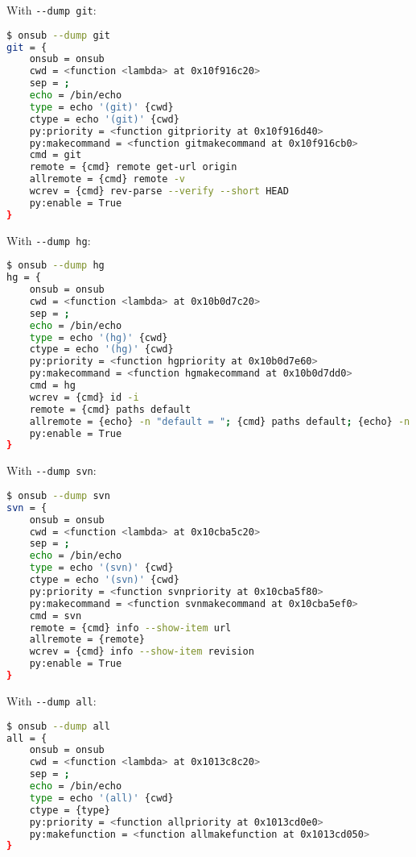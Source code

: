 With \lstinline{--dump git}:

\begin{snugshade}
\begin{lstlisting}[language=bash]	
$ onsub --dump git
git = {
	onsub = onsub
	cwd = <function <lambda> at 0x10f916c20>
	sep = ;
	echo = /bin/echo
	type = echo '(git)' {cwd}
	ctype = echo '(git)' {cwd}
	py:priority = <function gitpriority at 0x10f916d40>
	py:makecommand = <function gitmakecommand at 0x10f916cb0>
	cmd = git
	remote = {cmd} remote get-url origin
	allremote = {cmd} remote -v
	wcrev = {cmd} rev-parse --verify --short HEAD
	py:enable = True
}
\end{lstlisting}
\end{snugshade}

With \lstinline{--dump hg}:

\begin{snugshade}
\begin{lstlisting}[language=bash]	
$ onsub --dump hg
hg = {
	onsub = onsub
	cwd = <function <lambda> at 0x10b0d7c20>
	sep = ;
	echo = /bin/echo
	type = echo '(hg)' {cwd}
	ctype = echo '(hg)' {cwd}
	py:priority = <function hgpriority at 0x10b0d7e60>
	py:makecommand = <function hgmakecommand at 0x10b0d7dd0>
	cmd = hg
	wcrev = {cmd} id -i
	remote = {cmd} paths default
	allremote = {echo} -n "default = "; {cmd} paths default; {echo} -n "default-push = "; {cmd} paths default-push; {echo} -n "default-pull = "; {cmd} paths default-pull
	py:enable = True
}
\end{lstlisting}
\end{snugshade}

With \lstinline{--dump svn}:

\begin{snugshade}
\begin{lstlisting}[language=bash]
$ onsub --dump svn
svn = {
	onsub = onsub
	cwd = <function <lambda> at 0x10cba5c20>
	sep = ;
	echo = /bin/echo
	type = echo '(svn)' {cwd}
	ctype = echo '(svn)' {cwd}
	py:priority = <function svnpriority at 0x10cba5f80>
	py:makecommand = <function svnmakecommand at 0x10cba5ef0>
	cmd = svn
	remote = {cmd} info --show-item url
	allremote = {remote}
	wcrev = {cmd} info --show-item revision
	py:enable = True
}
\end{lstlisting}
\end{snugshade}

With \lstinline{--dump all}:

\begin{snugshade}
\begin{lstlisting}[language=bash]	
$ onsub --dump all
all = {
	onsub = onsub
	cwd = <function <lambda> at 0x1013c8c20>
	sep = ;
	echo = /bin/echo
	type = echo '(all)' {cwd}
	ctype = {type}
	py:priority = <function allpriority at 0x1013cd0e0>
	py:makefunction = <function allmakefunction at 0x1013cd050>
}
\end{lstlisting}
\end{snugshade}

